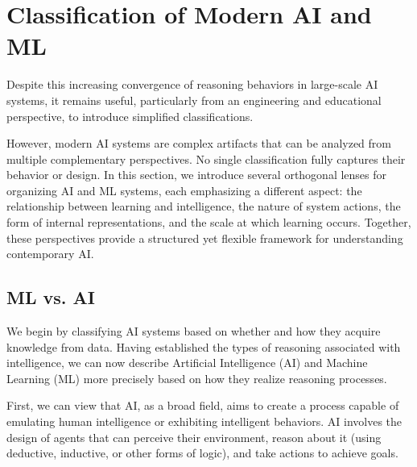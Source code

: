 \documentclass[12pt]{article}
\begin{document}
\section{Classification of Modern AI and ML}
Despite this increasing convergence of reasoning behaviors in large-scale AI systems, it remains useful, particularly from an engineering and educational perspective, to introduce simplified classifications. %


However, modern AI systems are complex artifacts that can be analyzed from multiple complementary perspectives. No single classification fully captures their behavior or design. In this section, we introduce several orthogonal lenses for organizing AI and ML systems, each emphasizing a different aspect: the relationship between learning and intelligence, the nature of system actions, the form of internal representations, and the scale at which learning occurs. Together, these perspectives provide a structured yet flexible framework for understanding contemporary AI.


\subsection{ML vs. AI}

We begin by classifying AI systems based on whether and how they acquire knowledge from data. Having established the types of reasoning associated with intelligence, we can now describe Artificial Intelligence (AI) and Machine Learning (ML) more precisely based on how they realize reasoning processes. 

First, we can view that AI, as a broad field, aims to create a process capable of emulating human intelligence or exhibiting intelligent behaviors. AI involves the design of agents that can perceive their environment, reason about it (using deductive, inductive, or other forms of logic), and take actions to achieve goals.
\end{document}
